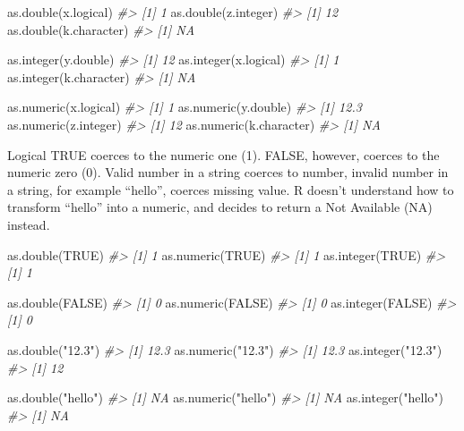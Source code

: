 \documentclass[
]{book}
\newenvironment{Shaded}{\begin{snugshade}}{\end{snugshade}}
\newcommand{\CommentTok}[1]{\textcolor[rgb]{0.56,0.35,0.01}{\textit{#1}}}
\newcommand{\ConstantTok}[1]{\textcolor[rgb]{0.00,0.00,0.00}{#1}}
\newcommand{\FunctionTok}[1]{\textcolor[rgb]{0.00,0.00,0.00}{#1}}
\newcommand{\NormalTok}[1]{#1}
\newcommand{\StringTok}[1]{\textcolor[rgb]{0.31,0.60,0.02}{#1}}
\begin{document}
\begin{Shaded}
\begin{Highlighting}[]
\FunctionTok{as.double}\NormalTok{(x.logical)}
\CommentTok{\#\textgreater{} [1] 1}
\FunctionTok{as.double}\NormalTok{(z.integer)}
\CommentTok{\#\textgreater{} [1] 12}
\FunctionTok{as.double}\NormalTok{(k.character)}
\CommentTok{\#\textgreater{} [1] NA}

\FunctionTok{as.integer}\NormalTok{(y.double)}
\CommentTok{\#\textgreater{} [1] 12}
\FunctionTok{as.integer}\NormalTok{(x.logical)}
\CommentTok{\#\textgreater{} [1] 1}
\FunctionTok{as.integer}\NormalTok{(k.character)}
\CommentTok{\#\textgreater{} [1] NA}

\FunctionTok{as.numeric}\NormalTok{(x.logical)}
\CommentTok{\#\textgreater{} [1] 1}
\FunctionTok{as.numeric}\NormalTok{(y.double)}
\CommentTok{\#\textgreater{} [1] 12.3}
\FunctionTok{as.numeric}\NormalTok{(z.integer)}
\CommentTok{\#\textgreater{} [1] 12}
\FunctionTok{as.numeric}\NormalTok{(k.character)}
\CommentTok{\#\textgreater{} [1] NA}
\end{Highlighting}
\end{Shaded}

Logical TRUE coerces to the numeric one (1). FALSE, however, coerces to the numeric zero (0). Valid number in a string coerces to number, invalid number in a string, for example ``hello'', coerces missing value. R doesn't understand how to transform ``hello'' into a numeric, and decides to return a Not Available (NA) instead.

\begin{Shaded}
\begin{Highlighting}[]
\FunctionTok{as.double}\NormalTok{(}\ConstantTok{TRUE}\NormalTok{)}
\CommentTok{\#\textgreater{} [1] 1}
\FunctionTok{as.numeric}\NormalTok{(}\ConstantTok{TRUE}\NormalTok{)}
\CommentTok{\#\textgreater{} [1] 1}
\FunctionTok{as.integer}\NormalTok{(}\ConstantTok{TRUE}\NormalTok{)}
\CommentTok{\#\textgreater{} [1] 1}

\FunctionTok{as.double}\NormalTok{(}\ConstantTok{FALSE}\NormalTok{)}
\CommentTok{\#\textgreater{} [1] 0}
\FunctionTok{as.numeric}\NormalTok{(}\ConstantTok{FALSE}\NormalTok{)}
\CommentTok{\#\textgreater{} [1] 0}
\FunctionTok{as.integer}\NormalTok{(}\ConstantTok{FALSE}\NormalTok{)}
\CommentTok{\#\textgreater{} [1] 0}

\FunctionTok{as.double}\NormalTok{(}\StringTok{"12.3"}\NormalTok{)}
\CommentTok{\#\textgreater{} [1] 12.3}
\FunctionTok{as.numeric}\NormalTok{(}\StringTok{"12.3"}\NormalTok{)}
\CommentTok{\#\textgreater{} [1] 12.3}
\FunctionTok{as.integer}\NormalTok{(}\StringTok{"12.3"}\NormalTok{)}
\CommentTok{\#\textgreater{} [1] 12}

\FunctionTok{as.double}\NormalTok{(}\StringTok{"hello"}\NormalTok{)}
\CommentTok{\#\textgreater{} [1] NA}
\FunctionTok{as.numeric}\NormalTok{(}\StringTok{"hello"}\NormalTok{)}
\CommentTok{\#\textgreater{} [1] NA}
\FunctionTok{as.integer}\NormalTok{(}\StringTok{"hello"}\NormalTok{)}
\CommentTok{\#\textgreater{} [1] NA}
\end{Highlighting}
\end{Shaded}
\end{document}
